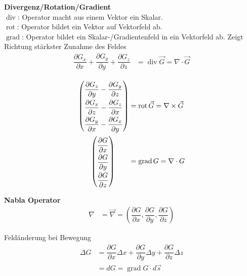 \textbf{Divergenz/Rotation/Gradient}\\
$\operatorname{div}$: Operator macht aus einem Vektor ein Skalar.\\
$\operatorname{rot}$: Operator bildet ein Vektor auf Vektorfeld ab.\\
$\operatorname{grad}$: Operator bildet ein Skalar-/Gradientenfeld in ein Vektorfeld ab.
Zeigt Richtung stärkster Zunahme des Feldes
\begin{align*}
    \dfrac{\partial G_x}{\partial x} + \dfrac{\partial G_y}{\partial y} + \dfrac{\partial G_z}{\partial z} &= \operatorname{div} \vec{G} = \nabla \cdot \vec{G}\\
\end{align*}
\begin{align*}
    \arraycolsep=1.0pt\def\arraystretch{2.0}
    \begin{pmatrix}
        \dfrac{\partial G_z}{\partial y} - \dfrac{\partial G_y}{\partial z} \\
        \dfrac{\partial G_x}{\partial z} - \dfrac{\partial G_z}{\partial x} \\
        \dfrac{\partial G_y}{\partial x} - \dfrac{\partial G_x}{\partial y} \\
    \end{pmatrix} & = \operatorname{rot} \vec{G} = \nabla \times \vec{G}                                 \\
    \arraycolsep=1.0pt\def\arraystretch{2.0}
    \begin{pmatrix}
        \dfrac{\partial G}{\partial x} \\
        \dfrac{\partial G}{\partial y} \\
        \dfrac{\partial G}{\partial z} \\
    \end{pmatrix} \qquad                                      & = \operatorname{grad} G = \nabla \cdot G
\end{align*}

\textbf{Nabla Operator}
\begin{align*}
    \nabla &= \vec{\nabla} = \left( \dfrac{\partial G}{\partial x}, \dfrac{\partial G}{\partial y}, \dfrac{\partial G}{\partial z} \right)
\end{align*}

Feldänderung bei Bewegung
\begin{align*}
    \Delta G &= \dfrac{\partial G}{\partial x} \Delta x + \dfrac{\partial G}{\partial y} \Delta y + \dfrac{\partial G}{\partial z} \Delta z \\
             &= dG = \operatorname{grad} G \cdot d \vec{s}
\end{align*}

